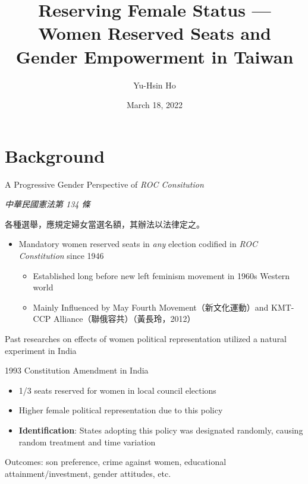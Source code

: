 \documentclass[
  10pt,
  ignorenonframetext,
  aspectratio=43,
]{beamer}
\title{Reserving Female Status --- Women Reserved Seats and Gender
Empowerment in Taiwan}
\author{Yu-Hsin Ho}
\date{March 18, 2022}
\institute{Department of Economics, National Taiwan University}
\providecommand{\tightlist}{%
  \setlength{\itemsep}{0pt}\setlength{\parskip}{0pt}}
\renewenvironment{quote}{\begin{customblockquote}\list{}{\rightmargin=0em\leftmargin=0em}%
\item\relax\color{blockquote-text}\ignorespaces}{\unskip\unskip\endlist\end{customblockquote}}
\begin{document}
\frame{\titlepage}

\begin{frame}
  \tableofcontents[hideallsubsections]
\end{frame}
\hypertarget{background}{%
\section{Background}\label{background}}

\begin{frame}{A Progressive Gender Perspective of \emph{ROC
Consitution}}
\protect\hypertarget{a-progressive-gender-perspective-of-roc-consitution}{}
\begin{quote}
\emph{中華民國憲法第 134 條}

各種選舉，應規定婦女當選名額，其辦法以法律定之。
\end{quote}

\begin{itemize}
\tightlist
\item
  Mandatory women reserved seats in \emph{any} election codified in
  \emph{ROC Constitution} since 1946

  \begin{itemize}
  \tightlist
  \item
    Established long before new left feminism movement in 1960s Western
    world
  \item
    Mainly Influenced by May Fourth Movement（新文化運動）and KMT-CCP
    Alliance（聯俄容共）（黃長玲，2012）
  \end{itemize}
\end{itemize}
\end{frame}

\begin{frame}
Past researches on effects of women political representation utilized a
natural experiment in India

\begin{block}{1993 Constitution Amendment in India}
\protect\hypertarget{constitution-amendment-in-india}{}
\begin{itemize}
\tightlist
\item
  1/3 seats reserved for women in local council elections
\item
  Higher female political representation due to this policy
\item
  \textbf{Identification}: States adopting this policy was designated
  randomly, causing random treatment and time variation
\end{itemize}

Outcomes: son preference, crime against women, educational
attainment/investment, gender attitudes, etc.
\end{block}
\end{frame}
\end{document}
